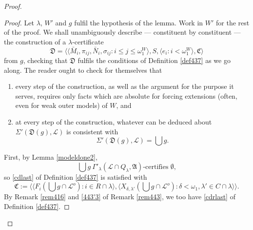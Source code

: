 \documentclass[12pt]{article}
\numberwithin{equation}{section}
\begin{document}
\begin{proof}
\begin{proof}
Let $\lambda$, $W'$ and $g$ fulfil the hypothesis of the lemma. Work in $W'$ for the rest of the proof. We shall unambiguously describe --- constituent by constituent --- the construction of a $\lambda$-certificate
\begin{equation*}
    \mathfrak{D} = \langle \langle \bar{M}_i, \pi_{ij}, \bar{N}_i, \sigma_{ij} : i \leq j \leq \omega_1^{W} \rangle, S, \langle e_i : i < \omega_1^W \rangle, \mathfrak{C} \rangle
\end{equation*}
from $g$, checking that $\mathfrak{D}$ fulfils the conditions of Definition \ref{def437} as we go along. The reader ought to check for themselves that 
\begin{enumerate}[label=(\Roman*)]
    \item every step of the construction, as well as the argument for the purpose it serves, requires only facts which are absolute for forcing extensions (often, even for weak outer models) of $W$, and
    \item at every step of the construction, whatever can be deduced about $\Sigma'(\mathfrak{D}(g), \mathcal{L})$ is consistent with 
    \begin{equation*}
        \Sigma'(\mathfrak{D}(g), \mathcal{L}) = \bigcup g \text{.}
    \end{equation*}
\end{enumerate}

First, by Lemma \ref{modeldone2}, 
\begin{equation*}
    \bigcup g \ \Gamma'_{\lambda} (\mathcal{L} \cap Q_{\lambda}, \mathfrak{A}) \text{-certifies } \emptyset \text{,}
\end{equation*}
so \ref{cdlast} of Definition \ref{def437} is satisfied with
\begin{equation*}
    \mathfrak{C} := \langle \langle F_i(\bigcup g \cap \mathcal{L}^o) : i \in R \cap \lambda \rangle, \langle X_{\delta, \lambda'}(\bigcup g \cap \mathcal{L}^o) : \delta < \omega_1, \lambda' \in C \cap \lambda \rangle \rangle \text{.}
\end{equation*}
By Remark \ref{rem416} and \ref{443'3} of Remark \ref{rem443}, we too have \ref{cdrlast} of Definition \ref{def437}. 


\end{proof}
\end{proof}
\end{document}
